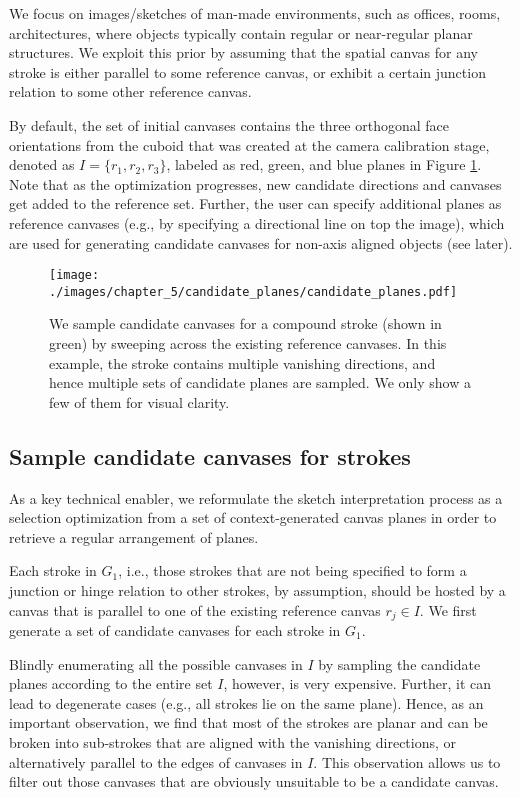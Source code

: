 We focus on images/sketches of man-made environments, such as offices, rooms, architectures, where objects typically contain regular or near-regular planar structures. We exploit this prior by assuming that the spatial canvas for any stroke is either parallel to some reference canvas, or exhibit a certain junction relation to some other reference canvas. %


By default, the set of initial canvases contains the three orthogonal face orientations from the cuboid that was created at the camera calibration stage, denoted as $I = \{r_1,r_2,r_3\}$, labeled as red, green, and blue planes in Figure \ref{fig:candidate_planes}. %
%
Note that as the optimization progresses, new candidate directions and canvases get added to the reference set.
%
Further, the user can specify additional planes as reference canvases (e.g., by specifying a directional line on top the image), which are used for generating candidate canvases for non-axis aligned objects (see later).

\begin{figure}[t!]
  \texttt{[image: ./images/chapter\_5/candidate\_planes/candidate\_planes.pdf]}
  \caption[Sweeping candidate planes.]{We sample candidate canvases for a compound stroke (shown in green) by sweeping across the existing reference canvases. In this example, the stroke contains multiple vanishing directions, and hence multiple sets of candidate planes are sampled. We only show a few of them for visual clarity.}
  \label{fig:candidate_planes}
\end{figure}


\subsection{Sample candidate canvases for strokes}

As a key technical enabler, we reformulate the sketch interpretation process as a selection optimization from a set of context-generated canvas planes in order to retrieve a regular arrangement of planes.

%
Each stroke in $G_1$, i.e., those strokes that are not being specified to form a junction or hinge relation to other strokes, by assumption, should be hosted by a canvas that is parallel to one of the existing reference canvas $r_j \in I$. We first generate a set of candidate canvases for each stroke in $G_1$.

Blindly enumerating all the possible canvases in $I$ by sampling the candidate planes according to the entire set $I$, however, is very expensive. Further, it can lead to degenerate cases (e.g., all strokes lie on the same plane). Hence, as an important observation, we find that most of the strokes are planar and can be broken into sub-strokes that are aligned with the vanishing directions, or alternatively parallel to the edges of canvases in $I$. This observation allows us to filter out those canvases that are obviously unsuitable to be a candidate canvas.

